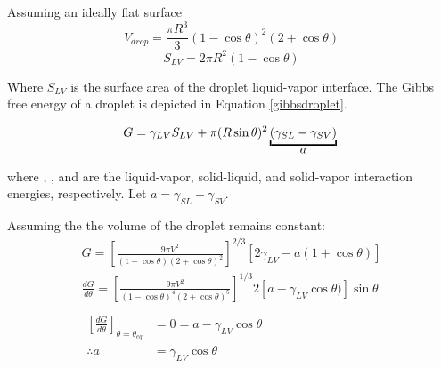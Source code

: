 

Assuming an ideally flat surface
\begin{equation} \label{dropvol}
V_{drop} = \frac{\pi R^{3}}{3} (1-\cos\theta)^{2} (2+\cos\theta)
\end{equation}
\begin{equation} \label{liqvapSA}
S_{LV} = 2\pi R^{2} (1-\cos\theta)
\end{equation}

Where $S_{LV}$ is the surface area of the droplet liquid-vapor interface. The Gibbs free energy of a droplet is depicted in Equation \ref{gibbsdroplet}.

\begin{equation} \label{gibbsdroplet}
G = \gamma_{LV} S_{LV} + \pi(R \sin\theta)^{2} \underbracket{(\gamma_{SL}-\gamma_{SV})}_{\text{\normalsize{$a$}}}\\
\end{equation}

where \gamLV, \gamSL, and \gamSV are the liquid-vapor, solid-liquid, and solid-vapor interaction energies, respectively. Let $a = \gamma_{SL}-\gamma_{SV}$. 

Assuming the the volume of the droplet remains constant:
\begin{equation*}
	\begin{gathered}
		G = \left[\frac{9\pi V^{2}}{(1-\cos\theta)(2+\cos\theta)^{2}}\right]^{2/3}
		\left[2\gamma_{LV} - a(1+\cos\theta)\right]\\
		\frac{dG}{d\theta} = \left[\frac{9\pi V^{2}}{(1-\cos\theta)^{4}(2+\cos\theta)^{5}}\right]^{1/3}
		2\left[a-\gamma_{LV}\cos\theta)\right]\sin\theta\\ \\
		\begin{split}
			\left[\frac{dG}{d\theta}\right]_{\theta=\theta_{eq}}&=0=a-\gamma_{LV}\cos\theta\\
			\therefore a 	&= \gamma_{LV}\cos\theta\\
		\end{split}					
	\end{gathered}
\end{equation*}